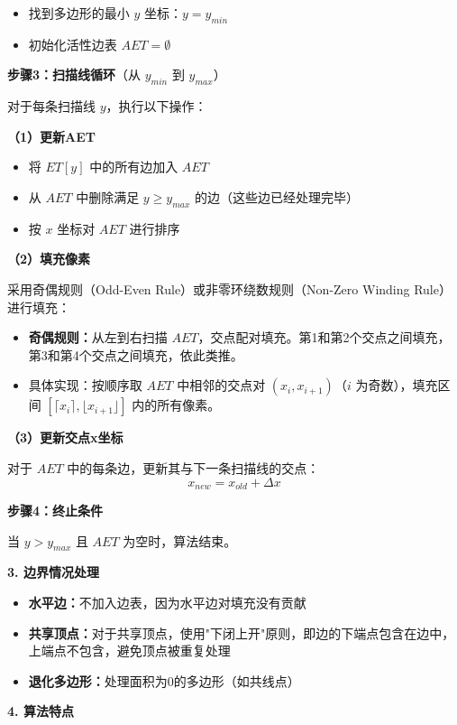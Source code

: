 ﻿\documentclass[12pt,a4paper]{article}
\begin{document}
\begin{tcolorbox}[breakable]
\begin{itemize}
\item 找到多边形的最小 $y$ 坐标：$y = y_{min}$
\item 初始化活性边表 $AET = \emptyset$
\end{itemize}

\textbf{步骤3：扫描线循环}（从 $y_{min}$ 到 $y_{max}$）

对于每条扫描线 $y$，执行以下操作：

\textbf{（1）更新AET}
\begin{itemize}
\item 将 $ET[y]$ 中的所有边加入 $AET$
\item 从 $AET$ 中删除满足 $y \geq y_{max}$ 的边（这些边已经处理完毕）
\item 按 $x$ 坐标对 $AET$ 进行排序
\end{itemize}

\textbf{（2）填充像素}

采用奇偶规则（Odd-Even Rule）或非零环绕数规则（Non-Zero Winding Rule）进行填充：
\begin{itemize}
\item \textbf{奇偶规则：}从左到右扫描 $AET$，交点配对填充。第1和第2个交点之间填充，第3和第4个交点之间填充，依此类推。
\item 具体实现：按顺序取 $AET$ 中相邻的交点对 $(x_i, x_{i+1})$（$i$ 为奇数），填充区间 $[\lceil x_i \rceil, \lfloor x_{i+1} \rfloor]$ 内的所有像素。
\end{itemize}

\textbf{（3）更新交点x坐标}

对于 $AET$ 中的每条边，更新其与下一条扫描线的交点：
\begin{equation}
x_{new} = x_{old} + \Delta x
\end{equation}

\textbf{步骤4：终止条件}

当 $y > y_{max}$ 且 $AET$ 为空时，算法结束。

\textbf{3. 边界情况处理}

\begin{itemize}
\item \textbf{水平边：}不加入边表，因为水平边对填充没有贡献
\item \textbf{共享顶点：}对于共享顶点，使用"下闭上开"原则，即边的下端点包含在边中，上端点不包含，避免顶点被重复处理
\item \textbf{退化多边形：}处理面积为0的多边形（如共线点）
\end{itemize}

\textbf{4. 算法特点}


\end{tcolorbox}
\end{document}
